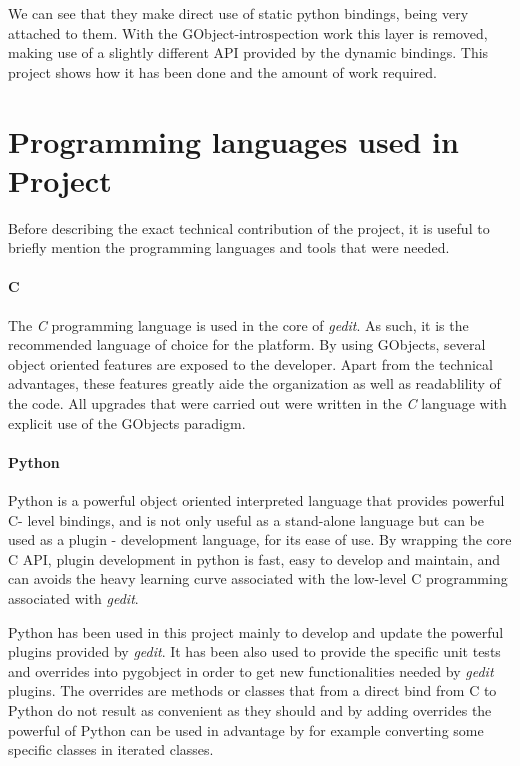 
We can see that they make direct use of static python bindings, being very attached 
to them. With the GObject-introspection work this layer is removed, making use of a 
slightly different API provided by the dynamic bindings. This project shows how it has 
been done and the amount of work required.


\section{Programming languages used in Project}
\label{sec:ProgrammingLanguages}

Before describing the exact technical contribution of the project, it is useful to briefly mention 
the programming languages and tools that were needed.  

\paragraph{C}

The \emph{C} programming language is used in the core of \emph{gedit}.   As such, it is 
the recommended language of choice for the platform.  By using GObjects, several 
object oriented features are exposed to the developer.  Apart from the technical advantages, 
these features greatly aide the organization as well as readablility of the code.
All upgrades that were carried out were written in the \emph{C} language with explicit
use of the GObjects paradigm. 

\paragraph{Python}

Python is a powerful object oriented interpreted language that provides powerful 
C- level bindings, and is not only useful as a stand-alone language but can be used 
as a plugin - development language, for its ease of use.   By wrapping the core 
C API, plugin development in python is fast, easy to develop and maintain, and 
can avoids the heavy learning curve associated with the low-level C programming 
associated with \emph{gedit}.

Python has been used in this project mainly to develop and update the powerful 
plugins provided by \emph{gedit}. It has been also used to provide the specific 
unit tests and overrides into pygobject in order to get new functionalities needed by 
\emph{gedit} plugins. The overrides are methods or classes that from a direct 
bind from C to Python do not result as convenient as they should and by adding 
overrides the powerful of Python can be used in advantage by for example converting
some specific classes in iterated classes.


